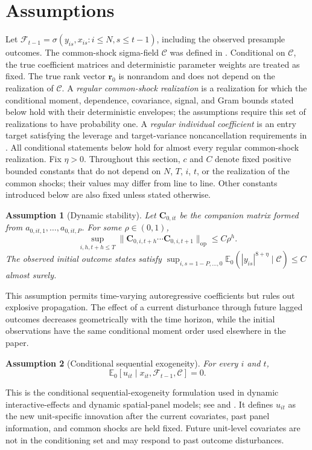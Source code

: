 \documentclass[11pt]{article}
\numberwithin{equation}{section}
\newtheorem{assumption}{Assumption}
\theoremstyle{remark}
\newcommand{\Ezero}{\mathbb E_0}
\newcommand{\op}{\operatorname{op}}
\newcommand{\br}{\bm r}
\newcommand{\bC}{\bm C}
\begin{document}
\section{Assumptions}
\label{sec:assumptions}

Let $\mathscr F_{t-1}=\sigma(y_{is},x_{is}:i\le N,s\le t-1)$, including the observed presample outcomes. The common-shock sigma-field $\mathscr C$ was defined in . Conditional on $\mathscr C$, the true coefficient matrices and deterministic parameter weights are treated as fixed. The true rank vector $\br_0$ is nonrandom and does not depend on the realization of $\mathscr C$. A \emph{regular common-shock realization} is a realization for which the conditional moment, dependence, covariance, signal, and Gram bounds stated below hold with their deterministic envelopes; the assumptions require this set of realizations to have probability one. A \emph{regular individual coefficient} is an entry target satisfying the leverage and target-variance noncancellation requirements in . All conditional statements below hold for almost every regular common-shock realization. Fix $\eta>0$. Throughout this section, $c$ and $C$ denote fixed positive bounded constants that do not depend on $N$, $T$, $i$, $t$, or the realization of the common shocks; their values may differ from line to line. Other constants introduced below are also fixed unless stated otherwise.

\begin{assumption}[Dynamic stability]
\label{a:stab}
Let $\bC_{0,it}$ be the companion matrix formed from $a_{0,it,1},\ldots,a_{0,it,P}$. For some $\rho\in(0,1)$,
\begin{equation}
\label{eq:stability}
\sup_{i,h,t+h\le T}
\|\bC_{0,i,t+h}\cdots\bC_{0,i,t+1}\|_{\op}
\le C\rho^h.
\end{equation}
The observed initial outcome states satisfy $\sup_{i,s=1-P,\ldots,0}\Ezero(|y_{is}|^{8+\eta}\mid\mathscr C)\le C$ almost surely.
\end{assumption}
This assumption permits time-varying autoregressive coefficients but rules out explosive propagation. The effect of a current disturbance through future lagged outcomes decreases geometrically with the time horizon, while the initial observations have the same conditional moment order used elsewhere in the paper.

\begin{assumption}[Conditional sequential exogeneity]
\label{a:exog}
For every $i$ and $t$,
\begin{equation}
\label{eq:conditional_exogeneity}
\Ezero[u_{it}\mid x_{it},\mathscr F_{t-1},\mathscr C]=0.
\end{equation}
\end{assumption}
This is the conditional sequential-exogeneity formulation used in dynamic interactive-effects and dynamic spatial-panel models; see \citet{moonweidner2017} and \citet{kuersteinerprucha2020}. It defines $u_{it}$ as the new unit-specific innovation after the current covariates, past panel information, and common shocks are held fixed. Future unit-level covariates are not in the conditioning set and may respond to past outcome disturbances.
\end{document}
